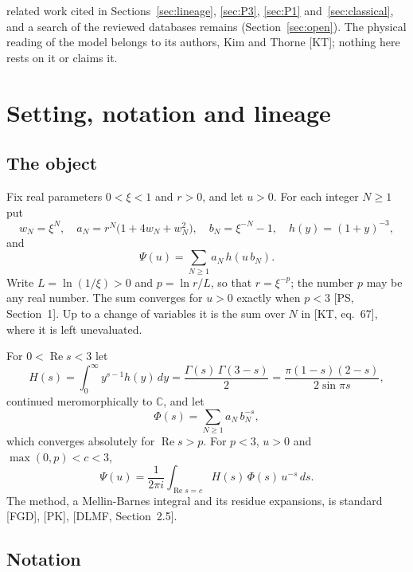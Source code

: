 \documentclass[11pt]{article}
\newcommand{\re}{\operatorname{Re}}
\begin{document}
related work cited in Sections~\ref{sec:lineage}, \ref{sec:P3}, \ref{sec:P1} and~\ref{sec:classical}, and a search of the reviewed databases remains (Section~\ref{sec:open}). The physical reading of the model belongs to its authors, Kim and Thorne [KT]; nothing here rests on it or claims it.

\section{Setting, notation and lineage}\label{sec:setting}

\subsection{The object}

Fix real parameters $0<\xi<1$ and $r>0$, and let $u>0$. For each integer $N\ge1$ put
\[
w_N=\xi^N,\quad a_N=r^N\bigl(1+4w_N+w_N^2\bigr),\quad b_N=\xi^{-N}-1,\quad h(y)=(1+y)^{-3},
\]
and
\[
\Psi(u)=\sum_{N\ge1}a_N\,h(u\,b_N).
\]
Write $L=\ln(1/\xi)>0$ and $p=\ln r/L$, so that $r=\xi^{-p}$; the number $p$ may be any real number. The sum converges for $u>0$ exactly when $p<3$ [PS, Section~1]. Up to a change of variables it is the sum over $N$ in [KT, eq.~67], where it is left unevaluated.

For $0<\re s<3$ let
\[
H(s)=\int_0^\infty y^{s-1}h(y)\,dy=\frac{\Gamma(s)\,\Gamma(3-s)}{2}=\frac{\pi(1-s)(2-s)}{2\sin\pi s},
\]
continued meromorphically to $\mathbb{C}$, and let
\[
\Phi(s)=\sum_{N\ge1}a_N\,b_N^{-s},
\]
which converges absolutely for $\re s>p$. For $p<3$, $u>0$ and $\max(0,p)<c<3$,
\begin{equation*}
\Psi(u)=\frac{1}{2\pi i}\int_{\re s=c}H(s)\,\Phi(s)\,u^{-s}\,ds. \tag{MB}
\end{equation*}
The method, a Mellin-Barnes integral and its residue expansions, is standard [FGD], [PK], [DLMF, Section~2.5].

\subsection{Notation}\label{sec:notation}
\end{document}
